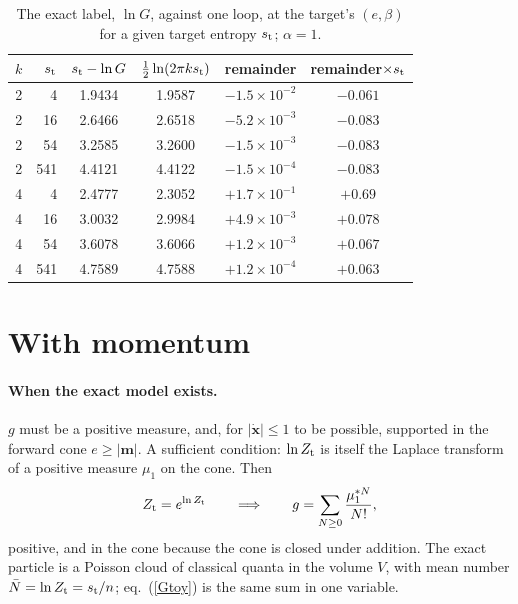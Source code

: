 \documentclass[11pt,aps,preprint,nofootinbib,superscriptaddress,tightenlines]{revtex4-2}
\def\st{\begin{equation}}
\def\stp{\end{equation}}
\def\Eq#1{eq.~(\ref{#1})}
\let\oldparagraph\paragraph
\renewcommand{\paragraph}{\par\bigskip\oldparagraph}
\begin{document}
\begin{table}[h]
\caption{The exact label, $\ln G$, against one loop, at the target's $(e,\beta)$ for a given target entropy $s_{\rm t}$; $\alpha=1$.}
\label{tab:toy}
\begin{ruledtabular}
\begin{tabular}{rrcccc}
$k$ & $s_{\rm t}$ & $s_{\rm t}-\ln G$ & $\tfrac12\ln(2\pi ks_{\rm t})$ & remainder & remainder$\times s_{\rm t}$ \\
\hline
2 & 4   & 1.9434 & 1.9587 & $-1.5\times10^{-2}$ & $-0.061$ \\
2 & 16  & 2.6466 & 2.6518 & $-5.2\times10^{-3}$ & $-0.083$ \\
2 & 54  & 3.2585 & 3.2600 & $-1.5\times10^{-3}$ & $-0.083$ \\
2 & 541 & 4.4121 & 4.4122 & $-1.5\times10^{-4}$ & $-0.083$ \\
4 & 4   & 2.4777 & 2.3052 & $+1.7\times10^{-1}$ & $+0.69$ \\
4 & 16  & 3.0032 & 2.9984 & $+4.9\times10^{-3}$ & $+0.078$ \\
4 & 54  & 3.6078 & 3.6066 & $+1.2\times10^{-3}$ & $+0.067$ \\
4 & 541 & 4.7589 & 4.7588 & $+1.2\times10^{-4}$ & $+0.063$ \\
\end{tabular}
\end{ruledtabular}
\end{table}

\section{With momentum}
\label{sec:momentum}

\paragraph{When the exact model exists.}  $g$ must be a positive measure, and, for $|\dot{\bm x}|\le1$ to be possible, supported in the
forward cone $e\ge|\bm m|$.  A sufficient condition: $\ln Z_{\rm t}$ is itself the Laplace transform of a positive measure $\mu_1$ on the cone.  Then
\st
Z_{\rm t}=e^{\ln Z_{\rm t}}\qquad\Longrightarrow\qquad g=\sum_{N\ge0}\frac{\mu_1^{*N}}{N!},
\stp
positive, and in the cone because the cone is closed under addition.  The exact particle is a Poisson cloud of classical quanta in the volume
$V$, with mean number $\bar N=\ln Z_{\rm t}=s_{\rm t}/n$; \Eq{Gtoy} is the same sum in one variable.
\end{document}
